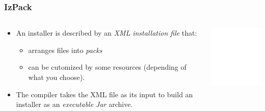 \documentclass{beamer}
\begin{document}
\begin{frame}

\frametitle{IzPack}

\begin{columns}

  \begin{column}{6.5cm}
  \begin{itemize}

    \item An installer is described by an \textsl{XML installation file} that:
      \begin{itemize}
        \item arranges files into \textsl{packs}
        \item can be cutomized by some resources (depending of what you choose).
      \end{itemize}

    \item The compiler takes the XML file as its input to build an installer as
    an \textsl{executable Jar} archive.

  \end{itemize}
  \end{column}

  \begin{column}{4cm}
  \includegraphics[width=4cm,angle=270]{izpack-overview}
  \end{column}

\end{columns}

\end{frame}

\end{document}
